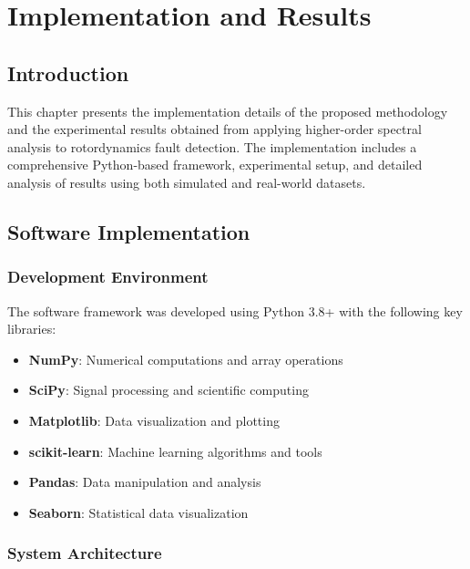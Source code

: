 
\chapter{Implementation and Results}

\section{Introduction}

This chapter presents the implementation details of the proposed methodology and the experimental results obtained from applying higher-order spectral analysis to rotordynamics fault detection. The implementation includes a comprehensive Python-based framework, experimental setup, and detailed analysis of results using both simulated and real-world datasets.

\section{Software Implementation}

\subsection{Development Environment}

The software framework was developed using Python 3.8+ with the following key libraries:

\begin{itemize}
    \item \textbf{NumPy}: Numerical computations and array operations
    \item \textbf{SciPy}: Signal processing and scientific computing
    \item \textbf{Matplotlib}: Data visualization and plotting
    \item \textbf{scikit-learn}: Machine learning algorithms and tools
    \item \textbf{Pandas}: Data manipulation and analysis
    \item \textbf{Seaborn}: Statistical data visualization
\end{itemize}

\subsection{System Architecture}


